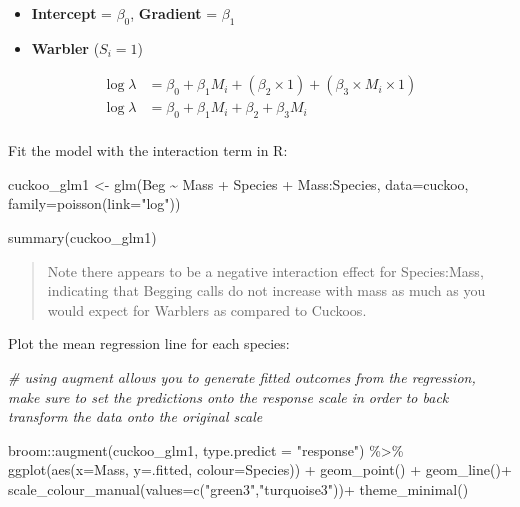 \documentclass[
]{book}
\newenvironment{Shaded}{\begin{snugshade}}{\end{snugshade}}
\newcommand{\AttributeTok}[1]{\textcolor[rgb]{0.77,0.63,0.00}{#1}}
\newcommand{\CommentTok}[1]{\textcolor[rgb]{0.56,0.35,0.01}{\textit{#1}}}
\newcommand{\FunctionTok}[1]{\textcolor[rgb]{0.00,0.00,0.00}{#1}}
\newcommand{\NormalTok}[1]{#1}
\newcommand{\OtherTok}[1]{\textcolor[rgb]{0.56,0.35,0.01}{#1}}
\newcommand{\SpecialCharTok}[1]{\textcolor[rgb]{0.00,0.00,0.00}{#1}}
\newcommand{\StringTok}[1]{\textcolor[rgb]{0.31,0.60,0.02}{#1}}
\begin{document}
\begin{itemize}
\item
  \textbf{Intercept} = \(\beta_0\), \textbf{Gradient} = \(\beta_1\)
\item
  \textbf{Warbler} (\(S_i=1\))
\end{itemize}

\[
\begin{aligned}
    \log{\lambda} & = \beta_0 + \beta_1 M_i + (\beta_2 \times 1)  + (\beta_3 \times M_i \times 1)\\
    \log{\lambda} & = \beta_0 + \beta_1 M_i + \beta_2 + \beta_3M_i\\
\end{aligned}
\]

Fit the model with the interaction term in R:

\begin{Shaded}
\begin{Highlighting}[]
\NormalTok{cuckoo\_glm1 }\OtherTok{\textless{}{-}} \FunctionTok{glm}\NormalTok{(Beg }\SpecialCharTok{\textasciitilde{}}\NormalTok{ Mass }\SpecialCharTok{+}\NormalTok{ Species }\SpecialCharTok{+}\NormalTok{ Mass}\SpecialCharTok{:}\NormalTok{Species, }\AttributeTok{data=}\NormalTok{cuckoo, }\AttributeTok{family=}\FunctionTok{poisson}\NormalTok{(}\AttributeTok{link=}\StringTok{"log"}\NormalTok{))}

\FunctionTok{summary}\NormalTok{(cuckoo\_glm1)}
\end{Highlighting}
\end{Shaded}

\begin{quote}
Note there appears to be a negative interaction effect for Species:Mass, indicating that Begging calls do not increase with mass as much as you would expect for Warblers as compared to Cuckoos.
\end{quote}

Plot the mean regression line for each species:

\begin{Shaded}
\begin{Highlighting}[]
\CommentTok{\# using augment allows you to generate fitted outcomes from the regression, make sure to set the predictions onto the response scale in order to \textquotesingle{}back transform\textasciigrave{} the data onto the original scale}

\NormalTok{broom}\SpecialCharTok{::}\FunctionTok{augment}\NormalTok{(cuckoo\_glm1, }\AttributeTok{type.predict =} \StringTok{"response"}\NormalTok{) }\SpecialCharTok{\%\textgreater{}\%} 
\FunctionTok{ggplot}\NormalTok{(}\FunctionTok{aes}\NormalTok{(}\AttributeTok{x=}\NormalTok{Mass, }\AttributeTok{y=}\NormalTok{.fitted, }\AttributeTok{colour=}\NormalTok{Species)) }\SpecialCharTok{+} 
  \FunctionTok{geom\_point}\NormalTok{() }\SpecialCharTok{+}
  \FunctionTok{geom\_line}\NormalTok{()}\SpecialCharTok{+}
  \FunctionTok{scale\_colour\_manual}\NormalTok{(}\AttributeTok{values=}\FunctionTok{c}\NormalTok{(}\StringTok{"green3"}\NormalTok{,}\StringTok{"turquoise3"}\NormalTok{))}\SpecialCharTok{+}
  \FunctionTok{theme\_minimal}\NormalTok{()}
\end{Highlighting}
\end{Shaded}
\end{document}
